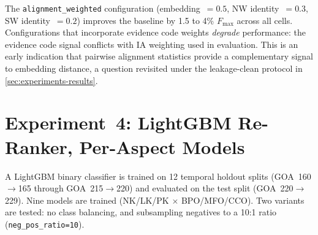 \begin{table}[htbp]
  \centering
  \caption[Fmax under five heuristic scoring configurations]{$F_{\max}$ under five heuristic scoring configurations.}
  \label{tab:results-scoring}
\end{table}

The \texttt{alignment\_weighted} configuration (embedding~$=0.5$, NW
identity~$=0.3$, SW identity~$=0.2$) improves the baseline by 1.5 to 4\%
$F_{\max}$ across all cells. Configurations that incorporate evidence code
weights \emph{degrade} performance: the evidence code signal conflicts with
IA weighting used in evaluation. This is an early indication that pairwise
alignment statistics provide a complementary signal to embedding distance,
a question revisited under the leakage-clean protocol in
\cref{sec:experiments-results}.

\section{Experiment~4: LightGBM Re-Ranker, Per-Aspect Models}
\label{subsec:exp4-reranker-pa}

A LightGBM binary classifier is trained on 12 temporal holdout splits
(GOA~160$\to$165 through GOA~215$\to$220) and evaluated on the test split
(GOA~220$\to$229). Nine models are trained (NK/LK/PK $\times$ BPO/MFO/CCO).
Two variants are tested: no class balancing, and subsampling negatives to a
10:1 ratio (\texttt{neg\_pos\_ratio=10}).

